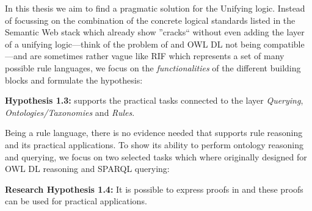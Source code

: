In this thesis we aim to find a pragmatic solution for the Unifying logic. Instead of focussing on the combination of the concrete logical standards listed in the 
Semantic Web stack which already show ''cracks`` without even adding the layer of a unifying logic---think of the problem of \rdf and OWL DL not being compatible---and 
are sometimes rather vague like RIF which represents a set of many possible rule languages, we focus on the \emph{functionalities} of the different building blocks and 
formulate the hypothesis:

\textbf{Hypothesis 1.3:}  \nthreelogic supports the practical tasks 
connected to the layer \emph{Querying}, \emph{Ontologies/Taxonomies} and \emph{Rules}.

Being a rule language, there is no evidence needed that \nthree supports rule reasoning and its practical applications. To show its ability to perform ontology reasoning and 
querying, we focus on two selected tasks which where originally designed for OWL DL reasoning and SPARQL querying: 





\textbf{Research Hypothesis 1.4:} It is possible to express proofs in  \nthreelogic and these proofs can be used for practical applications. 









% 
% 

% 

% 
% 
% 

% 
% 


